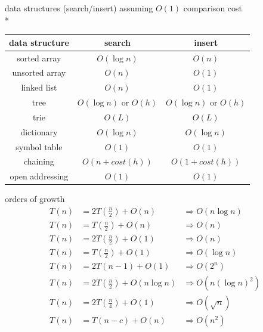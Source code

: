 \documentclass[10pt, landscape]{article}
\begin{document}
\begin{multicols}{3}
\begin{center}
        data structures (search/insert) assuming $O(1)$ comparison cost
        \\* \begin{tabular}{| c | c | c |}\hline
            \textbf{data structure} & \textbf{search} & \textbf{insert}\\\hline
            sorted array & $O(\log n)$ & $O(n)$ \\\hline
            unsorted array & $O(n)$ & $O(1)$ \\\hline
            linked list & $O(n)$ & $O(1)$ \\\hline
            tree & $O(\log n)$ or $O(h)$ & $O(\log n)$ or $O(h)$ \\\hline
            trie & $O(L)$ & $O(L)$ \\\hline
            dictionary & $O(\log n)$ & $O(\log n)$ \\\hline
            symbol table & $O(1)$ & $O(1)$ \\\hline
            chaining & $O(n + cost(h))$ & $O(1 + cost(h))$ \\\hline
            open addressing & $O(1)$ & $O(1)$ \\\hline
        \end{tabular}

        orders of growth
        \begin{align*}
            T(n) &= 2T(\frac{n}{2}) + O(n) &\Rightarrow O(n \log n)
            \\ T(n) &= T(\frac{n}{2}) + O(n) &\Rightarrow O(n)
            \\ T(n) &= 2T(\frac{n}{2}) + O(1) &\Rightarrow O(n)
            \\ T(n) &= T(\frac{n}{2}) + O(1) &\Rightarrow O(\log n)
            \\ T(n) &= 2T(n - 1) + O(1) &\Rightarrow O(2^n)
            \\ T(n) &= 2T(\frac{n}{2}) + O(n \log n) &\Rightarrow O(n(\log n)^2)
            \\ T(n) &= 2T(\frac{n}{4}) + O(1) &\Rightarrow O(\sqrt{n})
            \\ T(n) &= T(n - c) + O(n) &\Rightarrow O(n^2)
        \end{align*}
    
    \end{center}
\end{multicols}
\end{document}
